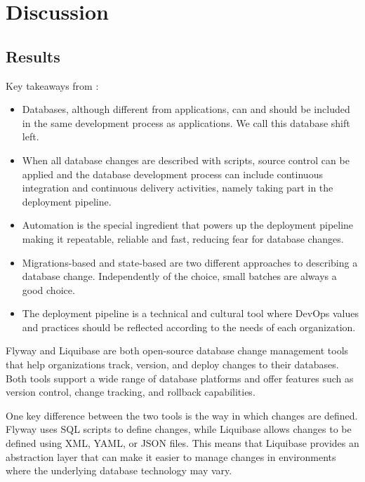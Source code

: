
\chapter{Discussion}

\section{Results}

%
Key takeaways from \cite{Piairo2018}:\\

\begin{itemize}
	\item Databases, although different from applications, can and should be included in the same development process as applications. We call this database shift left.
	\item When all database changes are described with scripts, source control can be applied and the database development process can include continuous integration and continuous delivery activities, namely taking part in the deployment pipeline.
	\item Automation is the special ingredient that powers up the deployment pipeline making it repeatable, reliable and fast, reducing fear for database changes.
	\item Migrations-based and state-based are two different approaches to describing a database change. Independently of the choice, small batches are always a good choice.
	\item The deployment pipeline is a technical and cultural tool where DevOps values and practices should be reflected according to the needs of each organization.    
\end{itemize}


%
Flyway and Liquibase are both open-source database change management tools that help organizations track, version, and deploy changes to their databases. Both tools support a wide range of database platforms and offer features such as version control, change tracking, and rollback capabilities.

One key difference between the two tools is the way in which changes are defined. Flyway uses SQL scripts to define changes, while Liquibase allows changes to be defined using XML, YAML, or JSON files. This means that Liquibase provides an abstraction layer that can make it easier to manage changes in environments where the underlying database technology may vary.

